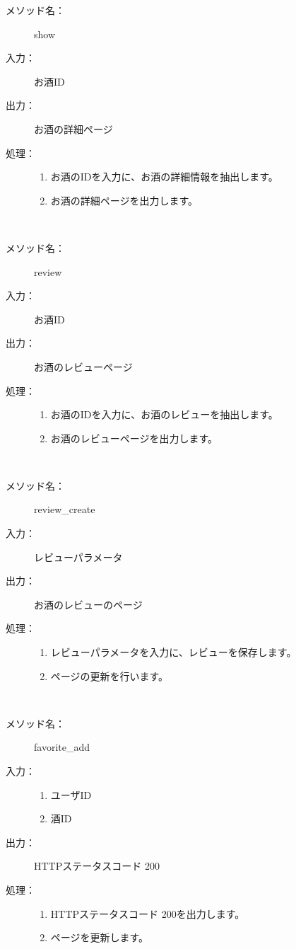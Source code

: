 \documentclass[a4j,titlepage]{jarticle}
\begin{document}
\begin{description}
\item [メソッド名：] show
\item [入力：] お酒ID
\item [出力：] お酒の詳細ページ
\item [処理：]\mbox{}
  \begin{enumerate}
  \item お酒のIDを入力に、お酒の詳細情報を抽出します。
  \item お酒の詳細ページを出力します。
  \end{enumerate}
\end{description}
​
\begin{description}
\item [メソッド名：] review
\item [入力：] お酒ID
\item [出力：] お酒のレビューページ
\item [処理：]\mbox{}
  \begin{enumerate}
  \item お酒のIDを入力に、お酒のレビューを抽出します。
  \item お酒のレビューページを出力します。
  \end{enumerate}
\end{description}
​
\begin{description}
\item [メソッド名：] review\_create
\item [入力：] レビューパラメータ
\item [出力：] お酒のレビューのページ
\item [処理：]\mbox{}
  \begin{enumerate}
  \item レビューパラメータを入力に、レビューを保存します。
  \item ページの更新を行います。
  \end{enumerate}
\end{description}
​
\begin{description}
\item [メソッド名：] favorite\_add
\item [入力：]
  \begin{enumerate}
    \item ユーザID
    \item 酒ID
  \end{enumerate}
\item [出力：] HTTPステータスコード 200
\item [処理：] \mbox{}
  \begin{enumerate}
  \item HTTPステータスコード 200を出力します。
  \item ページを更新します。
　\end{enumerate}
\end{description}
\end{document}
